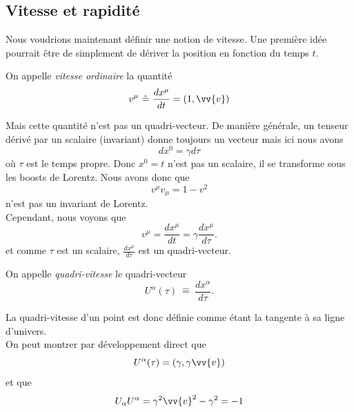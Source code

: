 \documentclass[a4paper,11pt]{report}
\begin{document}
        \subsection{Vitesse et rapidité}
        
            Nous voudrions maintenant définir une notion de vitesse. Une première idée pourrait être de simplement de dériver la position en fonction du temps $t$.
            \begin{defn}
                On appelle \textit{vitesse ordinaire} la quantité
                \begin{equation}
                v^\mu ~\hat{=}~ \frac{dx^\mu}{dt} = (1,\vv{v})
                \end{equation}
            \end{defn}
            Mais cette quantité n'est pas un quadri-vecteur. De manière générale, un tenseur dérivé par un scalaire (invariant) donne toujours un vecteur mais ici nous avons
            \begin{equation}
                dx^0 = \gamma d\tau
            \end{equation}
            où $\tau$ est le temps propre. Donc $x^0 = t$ n'est pas un scalaire, il se transforme sous les boosts de Lorentz. Nous avons donc que 
            \begin{equation}
                v^\mu v_\mu = 1-v^2 
            \end{equation}
            n'est pas un invariant de Lorentz.\\
            Cependant, nous voyons que
            \begin{equation}
                v^\mu = \frac{dx^\mu}{dt} = \gamma \frac{dx^\mu}{d\tau}.
            \end{equation}
            et comme $\tau$ est un scalaire, $\frac{dx^\mu}{d\tau}$ est un quadri-vecteur.
            \begin{defn}
                On appelle \textit{quadri-vitesse} le quadri-vecteur
                \begin{equation}
                    U^\alpha(\tau) ~\hat{=}~ \frac{dx^\alpha}{d\tau}.
                \end{equation}
            \end{defn}
            La quadri-vitesse d'un point est donc définie comme étant la tangente à sa ligne d'univers.\\
            On peut montrer par développement direct que 
            \begin{equation}
                U^\alpha(\tau) = (\gamma,\gamma\vv{v})
            \end{equation}
            et que 
            \begin{equation}
                U_\alpha U^\alpha = \gamma^2\vv{v}^2-\gamma^2 = -1
            \end{equation}
        
\end{document}
